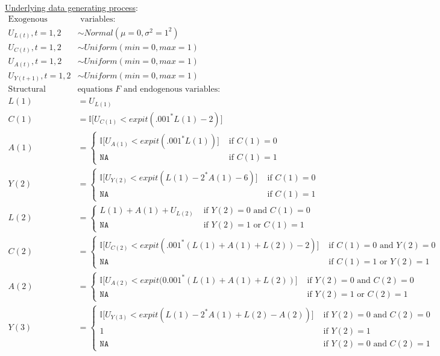 \documentclass[answers]{exam}
\begin{document}
\underline{Underlying data generating process}:
\begin{align*}
\text{Exogenous} & \text{ variables:} \\
U_{L(t)}, t = 1, 2 &\sim Normal(\mu=0, \sigma^2=1^2) \\
U_{C(t)}, t = 1, 2 &\sim Uniform(min=0, max=1) \\
U_{A(t)}, t = 1, 2 &\sim Uniform(min=0, max=1) \\
U_{Y(t+1)}, t = 1, 2 &\sim Uniform(min=0, max=1) \\
\text{Structural } & \text{equations $F$ and endogenous variables:}  \\
L(1) &= U_{L(1)}  \\
C(1) &= \mathbb{I} \big[ U_{C(1)} < expit(.001^*L(1) - 2) \big] \\
A(1) & = 
    \begin{cases}
      \mathbb{I} \big[ U_{A(1)} < expit(.001^*L(1)) \big]  & \text{ if } C(1) = 0\ \\
      \texttt{NA} & \text{ if } C(1) = 1
    \end{cases} \\ 
Y(2) &= 
    \begin{cases}
      \mathbb{I} \big[U_{Y(2)} < expit(L(1) - 2^*A(1) - 6) \big] & \text{ if } C(1) = 0\ \\
      \texttt{NA} & \text{ if } C(1) = 1
      \end{cases} \\
L(2) &= 
    \begin{cases}
      L(1) + A(1) + U_{L(2)}  & \text{ if } Y(2) = 0 \text{ and } C(1) = 0\ \\
      \texttt{NA} & \text{ if } Y(2) = 1 \text{ or } C(1) = 1
    \end{cases} \\
C(2) &= 
  \begin{cases}
  \mathbb{I} \big[ U_{C(2)} < expit(.001^*(L(1) + A(1) + L(2)) - 2 ) \big] & \text{ if } C(1) = 0 \text{ and } Y(2) = 0\ \\
  \texttt{NA} & \text{ if } C(1) = 1 \text{ or } Y(2) = 1
  \end{cases} \\
A(2) &= 
    \begin{cases}
      \mathbb{I} \big[ U_{A(2)} < expit(0.001^*(L(1) + A(1) + L(2)) \big]  & \text{ if } Y(2) = 0 \text{ and } C(2) = 0\ \\
      \texttt{NA} & \text{ if } Y(2) = 1 \text{ or } C(2) = 1
    \end{cases} \\
Y(3) &=  
    \begin{cases}
      \mathbb{I} \big[ U_{Y(3)} < expit(L(1) - 2^*A(1) + L(2) - A(2) ) \big] & \text{ if } Y(2) = 0 \text{ and } C(2) = 0\ \\
      1 & \text{ if } Y(2) = 1\ \\
      \texttt{NA} & \text{ if } Y(2) = 0 \text{ and } C(2) = 1 
    \end{cases} \\
\end{align*}
\end{document}
